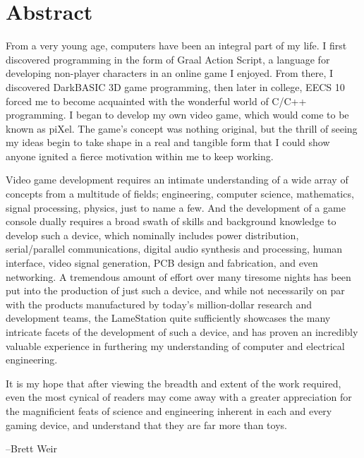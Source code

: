 \section{Abstract}

From a very young age, computers have been an integral part of my life.  I first discovered programming in the form of Graal Action Script, a language for developing non-player characters in an online game I enjoyed.  From there, I discovered DarkBASIC 3D game programming, then later in college, EECS 10 forced me to become acquainted with the wonderful world of C/C++ programming.  I began to develop my own video game, which would come to be known as piXel.  The game's concept was nothing original, but the thrill of seeing my ideas begin to take shape in a real and tangible form that I could show anyone ignited a fierce motivation within me to keep working.  

Video game development requires an intimate understanding of a wide array of concepts from a multitude of fields; engineering, computer science, mathematics, signal processing, physics, just to name a few.  And the development of a game console dually requires a broad swath of skills and background knowledge to develop such a device, which nominally includes power distribution, serial/parallel communications, digital audio synthesis and processing, human interface, video signal generation, PCB design and fabrication, and even networking.  A tremendous amount of effort over many tiresome nights has been put into the production of just such a device, and while not necessarily on par with the products manufactured by today's million-dollar research and development teams, the LameStation quite sufficiently showcases the many intricate facets of the development of such a device, and has proven an incredibly valuable experience in furthering my understanding of computer and electrical engineering.

It is my hope that after viewing the breadth and extent of the work required, even the most cynical of readers may come away with a greater appreciation for the magnificient feats of science and engineering inherent in each and every gaming device, and understand that they are far more than toys.

\begin{flushright}--Brett Weir\end{flushright}

